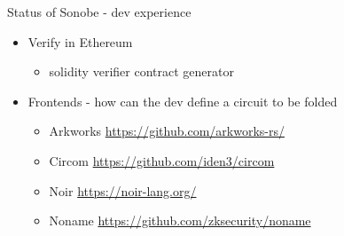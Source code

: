 \documentclass[t]{beamer}
\begin{document}
\begin{frame}{Status of Sonobe - dev experience}
  \begin{itemize}
    \item Verify in Ethereum
    \begin{itemize}
      \item solidity verifier contract generator
    \end{itemize}
    \item Frontends - how can the dev define a circuit to be folded
    \begin{itemize}
      \item Arkworks \href{https://github.com/arkworks-rs/}{https://github.com/arkworks-rs/}
      \item Circom \href{https://github.com/iden3/circom}{https://github.com/iden3/circom}
      \item Noir \href{https://noir-lang.org/}{https://noir-lang.org/}
      \item Noname \href{https://github.com/zksecurity/noname}{https://github.com/zksecurity/noname}
    \end{itemize}
  \end{itemize}
\end{frame}
\end{document}
